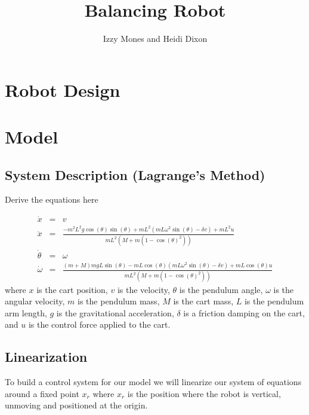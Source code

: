 \documentclass[]{article}
\title{Balancing Robot}
\author{Izzy Mones and Heidi Dixon}
\begin{document}
	\maketitle

\section*{Robot Design}


\section*{Model}
\subsection*{System Description (Lagrange's Method)}
Derive the equations here

\begin{eqnarray}
	\dot{x} & = & v \\
	\ddot{x}          & = & \frac{-m^2L^2g \cos(\theta)\sin(\theta) + mL^2(mL\omega^2 \sin(\theta)-\delta v)+mL^2u }{mL^2(M+m(1-\cos(\theta)^2))} \\
	\dot{\theta}  &= & \omega \\
	\dot{\omega}  &= & \frac{(m+M)mgL\sin(\theta)-mL\cos(\theta)(mL\omega^2\sin(\theta)-\delta v)+mL\cos(\theta)u}{mL^2(M+m(1-\cos(\theta)^2))}
\end{eqnarray}
where $x$ is the cart position, $v$ is the velocity, $\theta$ is the pendulum angle, $\omega$ is the angular velocity, $m$ is the pendulum mass, $M$ is the cart mass, $L$ is the pendulum arm length, $g$ is the gravitational acceleration, $\delta$ is a friction damping on the cart, and $u$ is the control force applied to the cart.


\subsection*{Linearization}
To build a control system for our model we will linearize our system of equations around a fixed point $x_r$ where $x_r$ is the position where the robot is vertical, unmoving and positioned at the origin.  
\end{document}

